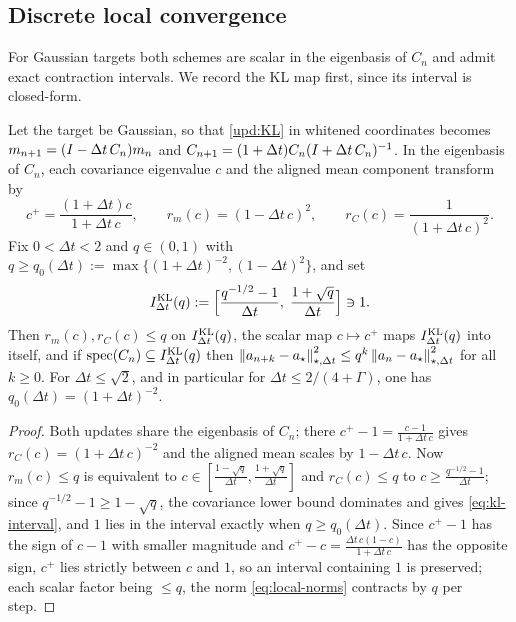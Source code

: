 \subsection{Discrete local convergence}
\label{subsec:disc-local}

For Gaussian targets both schemes are scalar in the eigenbasis of $C_n$ and admit exact
contraction intervals. We record the KL map first, since its interval is closed-form.

\begin{proposition}
\label{prop:Gauss-KL-map}
Let the target be Gaussian, so that \eqref{upd:KL} in whitened coordinates becomes
$m_{n+1}=(I-\Delta t\,C_n)m_n$ and $C_{n+1}=(1+\Delta t)C_n(I+\Delta t\,C_n)^{-1}$. In the
eigenbasis of $C_n$, each covariance eigenvalue $c$ and the aligned mean component transform by
\[
    c^+=\frac{(1+\Delta t)c}{1+\Delta t\,c},
    \qquad
    r_m(c)=(1-\Delta t\,c)^2,
    \qquad
    r_C(c)=\frac1{(1+\Delta t\,c)^2}.
\]
Fix $0<\Delta t<2$ and $q\in(0,1)$ with
$q\geq q_0(\Delta t):=\max\{(1+\Delta t)^{-2},(1-\Delta t)^2\}$, and set
\begin{equation}
\label{eq:kl-interval}
    I_{\Delta t}^{\mathrm{KL}}(q):=\Bigl[\frac{q^{-1/2}-1}{\Delta t},\;\frac{1+\sqrt q}{\Delta t}\Bigr]\ni1 .
\end{equation}
Then $r_m(c),r_C(c)\leq q$ on $I_{\Delta t}^{\mathrm{KL}}(q)$, the scalar map $c\mapsto c^+$ maps
$I_{\Delta t}^{\mathrm{KL}}(q)$ into itself, and if $\operatorname{spec}(C_n)\subseteq I_{\Delta t}^{\mathrm{KL}}(q)$
then $\left\lVert a_{n+k}-a_\star\right\rVert_{\star,\Delta t}^2\leq q^k\left\lVert a_n-a_\star\right\rVert_{\star,\Delta t}^2$ for
all $k\geq0$. For $\Delta t\leq\sqrt2$, and in particular for $\Delta t\leq2/(4+\Gamma)$, one
has $q_0(\Delta t)=(1+\Delta t)^{-2}$.
\end{proposition}

\begin{proof}
Both updates share the eigenbasis of $C_n$; there $c^+-1=\tfrac{c-1}{1+\Delta t\,c}$ gives
$r_C(c)=(1+\Delta t\,c)^{-2}$ and the aligned mean scales by $1-\Delta t\,c$. Now
$r_m(c)\leq q$ is equivalent to $c\in[\tfrac{1-\sqrt q}{\Delta t},\tfrac{1+\sqrt q}{\Delta t}]$
and $r_C(c)\leq q$ to $c\geq\tfrac{q^{-1/2}-1}{\Delta t}$; since $q^{-1/2}-1\geq1-\sqrt q$, the
covariance lower bound dominates and gives \eqref{eq:kl-interval}, and $1$ lies in the interval
exactly when $q\geq q_0(\Delta t)$. Since $c^+-1$ has the sign of $c-1$ with smaller magnitude
and $c^+-c=\tfrac{\Delta t\,c(1-c)}{1+\Delta t\,c}$ has the opposite sign, $c^+$ lies strictly
between $c$ and $1$, so an interval containing $1$ is preserved; each scalar factor being
$\leq q$, the norm \eqref{eq:local-norms} contracts by $q$ per step.
\end{proof}

